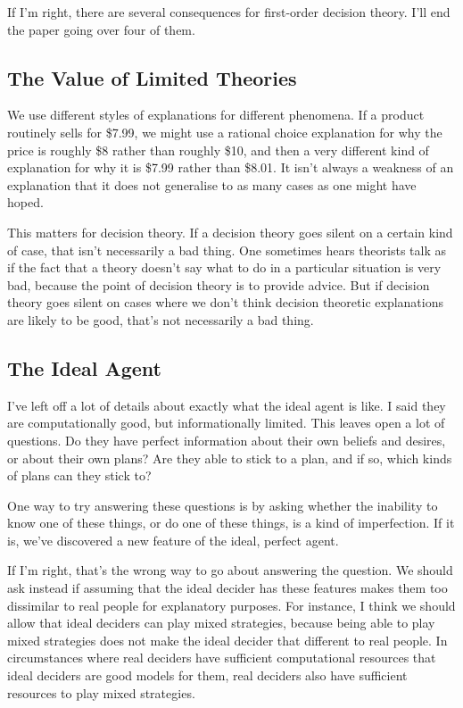 \documentclass[
  12pt,
  letterpaper,
  DIV=11,
  numbers=noendperiod,
  twoside]{scrartcl}
\begin{document}
If I'm right, there are several consequences for first-order decision
theory. I'll end the paper going over four of them.

\subsection{The Value of Limited
Theories}\label{the-value-of-limited-theories}

We use different styles of explanations for different phenomena. If a
product routinely sells for \$7.99, we might use a rational choice
explanation for why the price is roughly \$8 rather than roughly \$10,
and then a very different kind of explanation for why it is \$7.99
rather than \$8.01. It isn't always a weakness of an explanation that it
does not generalise to as many cases as one might have hoped.

This matters for decision theory. If a decision theory goes silent on a
certain kind of case, that isn't necessarily a bad thing. One sometimes
hears theorists talk as if the fact that a theory doesn't say what to do
in a particular situation is very bad, because the point of decision
theory is to provide advice. But if decision theory goes silent on cases
where we don't think decision theoretic explanations are likely to be
good, that's not necessarily a bad thing.

\subsection{The Ideal Agent}\label{the-ideal-agent}

I've left off a lot of details about exactly what the ideal agent is
like. I said they are computationally good, but informationally limited.
This leaves open a lot of questions. Do they have perfect information
about their own beliefs and desires, or about their own plans? Are they
able to stick to a plan, and if so, which kinds of plans can they stick
to?

One way to try answering these questions is by asking whether the
inability to know one of these things, or do one of these things, is a
kind of imperfection. If it is, we've discovered a new feature of the
ideal, perfect agent.

If I'm right, that's the wrong way to go about answering the question.
We should ask instead if assuming that the ideal decider has these
features makes them too dissimilar to real people for explanatory
purposes. For instance, I think we should allow that ideal deciders can
play mixed strategies, because being able to play mixed strategies does
not make the ideal decider that different to real people. In
circumstances where real deciders have sufficient computational
resources that ideal deciders are good models for them, real deciders
also have sufficient resources to play mixed strategies.
\end{document}
